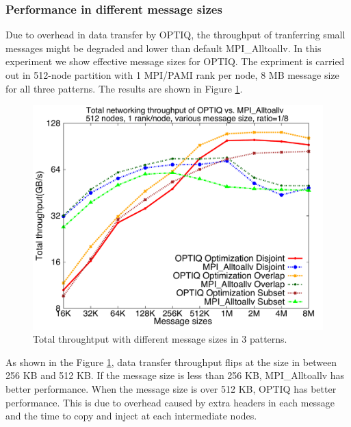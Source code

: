 \subsubsection{Performance in different message sizes}

Due to overhead in data transfer by OPTIQ, the throughput of tranferring small messages might be degraded and lower than default MPI\_Alltoallv. In this experiment we show effective message sizes for OPTIQ. The expriment is carried out in 512-node partition with 1 MPI/PAMI rank per node, 8 MB message size for all three patterns. The results are shown in Figure \ref{fig:messagesize}.

\begin{figure}[!htb]
\vspace{-0.1in}
\centering
\includegraphics[scale=0.30]{figures/messagesize.pdf}
\vspace{-0.1in}
\caption{Total throughtput with different message sizes in 3 patterns.}
\vspace{-0.1in}
\label{fig:messagesize}
\end{figure}

As shown in the Figure \ref{fig:messagesize}, data transfer throughput flips at the size in between 256 KB and 512 KB. If the message size is less than 256 KB, MPI\_Alltoallv has better performance. When the message size is over 512 KB, OPTIQ has better performance. This is due to overhead caused by extra headers in each message and the time to copy and inject at each intermediate nodes.
